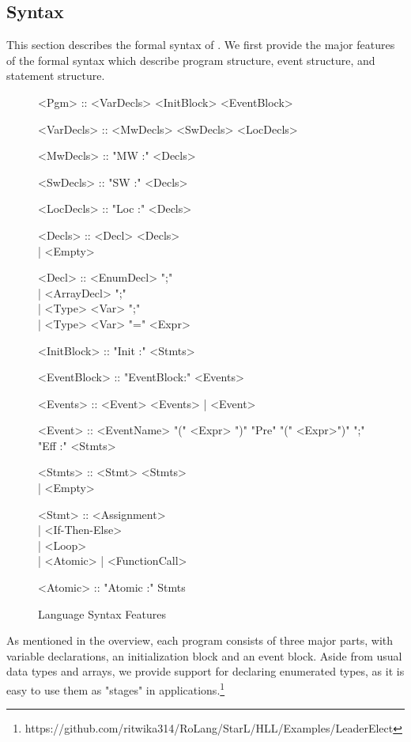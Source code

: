 \subsection{Syntax}
\label{sect:syntax}
This section describes the formal syntax of \rolang. We first provide the major features of the formal syntax which describe program structure, event structure, and statement structure. 
\begin{figure}[ht!]
\footnotesize
\begin{center}
\noindent\begin{minipage}{.5\textwidth}
\begin{grammar}
<Pgm> :: <VarDecls> <InitBlock> <EventBlock>

<VarDecls> :: <MwDecls> <SwDecls> <LocDecls>

<MwDecls> :: "MW :" <Decls>

<SwDecls> :: "SW :" <Decls>

<LocDecls> :: "Loc :" <Decls>

<Decls> :: <Decl> <Decls> \\
         | <Empty>

<Decl> :: <EnumDecl> ";" \\
         | <ArrayDecl> ";" \\
         | <Type> <Var> ";"\\
         | <Type> <Var> "=" <Expr>
 
<InitBlock> :: "Init :" <Stmts>
\end{grammar}
\end{minipage}\hfill
\noindent\begin{minipage}{.5\textwidth}
\begin{grammar}
<EventBlock> :: "EventBlock:" <Events>

<Events> :: <Event> <Events> | <Event>

<Event> :: <EventName> "(" <Expr> ")" "Pre" "(" <Expr>")" ";" "Eff :" <Stmts> 

<Stmts> :: <Stmt> <Stmts> \\
		| <Empty>

<Stmt> :: <Assignment> \\
		| <If-Then-Else> \\
        | <Loop>\\
        | <Atomic>
		| <FunctionCall>
        
<Atomic> :: "Atomic :" Stmts
\end{grammar}
\end{minipage}
\end{center}
\caption{Language Syntax Features}
\end{figure}
As mentioned in the overview, each program consists of three major parts, with variable declarations, an initialization block and an event block. Aside from usual data types and arrays, we provide support for declaring enumerated types, as it is easy to use them as "stages" in applications.\footnote{https://github.com/ritwika314/RoLang/StarL/HLL/Examples/LeaderElect}

